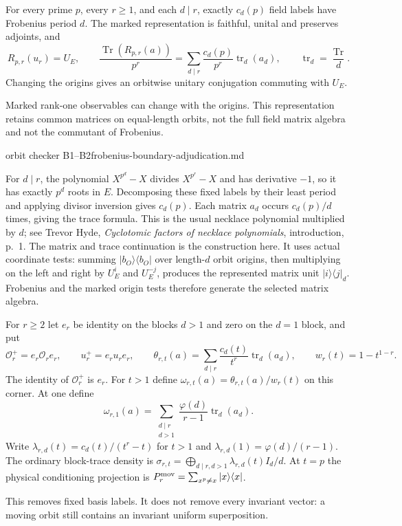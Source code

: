 \begin{proposition}
\statusProved\quad
For every prime $p$, every $r\geq1$, and each $d\mid r$, exactly $c_d(p)$
field labels have Frobenius period $d$. The marked representation is
faithful, unital and preserves adjoints, and
\[
 R_{p,r}(u_r)=U_E,\qquad
 \frac{\operatorname{Tr}(R_{p,r}(a))}{p^r}
   =\sum_{d\mid r}\frac{c_d(p)}{p^r}\operatorname{tr}_d(a_d),
 \qquad \operatorname{tr}_d=\frac{\operatorname{Tr}}d.
\]
Changing the origins gives an orbitwise unitary conjugation commuting with
$U_E$.
\end{proposition}
\begin{scope}
Marked rank-one observables can change with the origins. This representation
retains common matrices on equal-length orbits, not the full field matrix
algebra and not the commutant of Frobenius.
\end{scope}
{orbit checker B1--B2}{frobenius-boundary-adjudication.md}

For $d\mid r$, the polynomial $X^{p^d}-X$ divides $X^{p^r}-X$ and has
derivative $-1$, so it has exactly $p^d$ roots in $E$. Decomposing these
fixed labels by their least period and applying divisor inversion gives
$c_d(p)$. Each matrix $a_d$ occurs $c_d(p)/d$ times, giving the trace
formula. This is the usual necklace polynomial multiplied by $d$; see
Trevor Hyde, \emph{Cyclotomic factors of necklace polynomials}, introduction,
p.~1. The matrix and trace continuation is the construction here.
It uses actual coordinate tests: summing $|b_O\rangle\langle b_O|$ over
length-$d$ orbit origins, then multiplying on the left and right by
$U_E^i$ and $U_E^{-j}$, produces the represented matrix unit
$|i\rangle\langle j|_d$. Frobenius and the marked origin tests therefore
generate the selected matrix algebra.

\begin{definition}
For $r\geq2$ let $e_r$ be identity on the blocks $d>1$ and zero on the
$d=1$ block, and put
\[
 \mathcal O_r^+=e_r\mathcal O_re_r,\qquad u_r^+=e_ru_re_r,
 \qquad \theta_{r,t}(a)=\sum_{d\mid r}\frac{c_d(t)}{t^r}
                     \operatorname{tr}_d(a_d),\qquad
 w_r(t)=1-t^{1-r}.
\]
The identity of $\mathcal O_r^+$ is $e_r$. For $t>1$ define
$\omega_{r,t}(a)=\theta_{r,t}(a)/w_r(t)$ on this corner. At one define
\[
 \omega_{r,1}(a)=\sum_{\substack{d\mid r\\d>1}}
               \frac{\varphi(d)}{r-1}\operatorname{tr}_d(a_d).
\]
Write $\lambda_{r,d}(t)=c_d(t)/(t^r-t)$ for $t>1$ and
$\lambda_{r,d}(1)=\varphi(d)/(r-1)$. The ordinary block-trace density is
$\sigma_{r,t}=\bigoplus_{d\mid r,d>1}\lambda_{r,d}(t)I_d/d$.
At $t=p$ the physical conditioning projection is
$P_r^{\rm mov}=\sum_{x^p\ne x}|x\rangle\langle x|$.
\end{definition}
\begin{scope}
This removes fixed basis labels. It does not remove every invariant vector:
a moving orbit still contains an invariant uniform superposition.
\end{scope}

